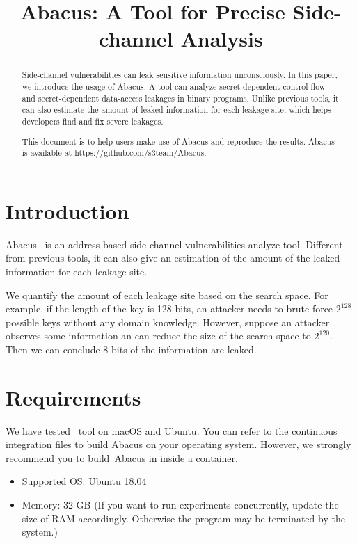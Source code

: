 \documentclass[10pt,conference]{IEEEtran}
\newcommand{\tool}{\textsf{Abacus}}
\begin{document}
\title{\tool{}: A Tool for Precise Side-channel Analysis}
\author{
}


\maketitle

\begin{abstract}
Side-channel vulnerabilities can leak sensitive information unconsciously. 
In this paper, we introduce the usage of Abacus. A tool can analyze secret-dependent control-flow and secret-dependent data-access leakages in binary programs. Unlike previous tools, it can also estimate the amount of leaked information for each leakage site, which helps developers find and fix severe leakages.

This document is to help users make use of Abacus and reproduce the
results. Abacus is available at \url{https://github.com/s3team/Abacus}.
\end{abstract}


\section{Introduction}


Abacus~\cite{bao2021abacus} is an address-based side-channel vulnerabilities analyze tool. Different from previous tools, it can also give an estimation of the amount of the leaked information for each leakage site.

We quantify the amount of each leakage site based on the search space. For example, if the length of the key is 128 bits, an attacker needs to brute force $2^{128}$ possible keys without any domain knowledge. However, suppose an attacker observes some information an can reduce the size of the search space to $2^{120}$. Then we can conclude 8 bits of the information are leaked.

\section{Requirements}
We have tested ~tool{} on macOS and Ubuntu. You can refer to the continuous integration files to build Abacus on your operating system. However, we strongly recommend you to build~\tool{} in inside a container.
\begin{itemize}
\item Supported OS: Ubuntu 18.04
\item Memory: 32 GB (If you want to run experiments concurrently, update the size of RAM
     accordingly. Otherwise the program may be terminated by the system.)
\end{itemize}
\end{document}
